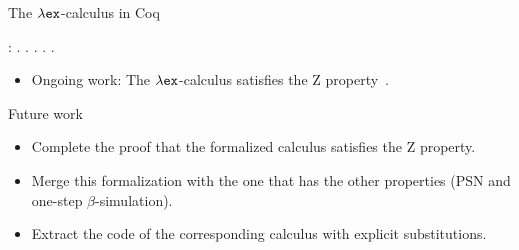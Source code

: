 \documentclass[10pt]{beamer}
\begin{document}
    \begin{frame}[fragile]{The $\lambda{\tt ex}$-calculus in Coq}
  \begin{coqdoccode}
 :  .\coqdoceol
\coqdocnoindent
{}.\coqdoceol
\coqdocindent{1.00em}
 .\coqdoceol
\coqdocindent{1.00em}
 .\coqdoceol
\coqdocnoindent
{}.\coqdoceol
\end{coqdoccode}

\begin{itemize}
\item Ongoing work: The  $\lambda{\tt ex}$-calculus satisfies the Z property~\cite{kes09}.
\end{itemize}
\end{frame}

\begin{frame}[fragile]{Future work}
  \begin{itemize}
  \item Complete the proof that the formalized calculus satisfies the
    Z property.
  \item Merge this formalization with the one that has the other properties (PSN and one-step $\beta$-simulation).
  \item Extract the code of the corresponding calculus with explicit substitutions.
  \end{itemize}
\end{frame}



\end{document}
